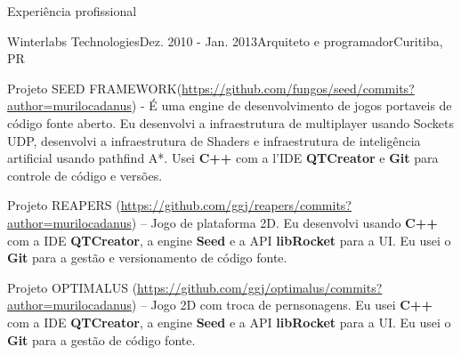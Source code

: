 \documentclass{resume}
\begin{document}
  \begin{rSection}{Experiência profissional}
    \begin{rSubsection}{Winterlabs Technologies}{Dez. 2010 - Jan. 2013}{Arquiteto e programador}{Curitiba, PR}
    \item Projeto SEED FRAMEWORK(\url{https://github.com/fungos/seed/commits?author=murilocadanus}) - É uma engine de desenvolvimento de jogos portaveis de código fonte aberto. Eu desenvolvi a infraestrutura de multiplayer usando Sockets UDP, desenvolvi a infraestrutura de Shaders e infraestrutura de inteligência artificial usando pathfind A*. Usei \textbf{C++} com a l'IDE \textbf{QTCreator} e \textbf{Git} para controle de código e versões. \\
    \item Projeto REAPERS (\url{https://github.com/ggj/reapers/commits?author=murilocadanus}) – Jogo de plataforma 2D. Eu desenvolvi usando \textbf{C++} com a IDE \textbf{QTCreator}, a engine \textbf{Seed} e a API \textbf{libRocket} para  a UI. Eu usei o \textbf{Git} para a gestão e versionamento de código fonte. \\
    \item Projeto OPTIMALUS (\url{https://github.com/ggj/optimalus/commits?author=murilocadanus}) – Jogo 2D com troca de pernsonagens. Eu usei \textbf{C++} com a IDE \textbf{QTCreator}, a engine \textbf{Seed} e a API \textbf{libRocket} para a UI. Eu usei o \textbf{Git} para a gestão de código fonte. \\

\end{rSubsection}
\end{rSection}
\end{document}

